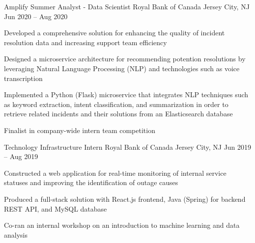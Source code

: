 

\begin{cventries}

  \cventry
	{Amplify Summer Analyst - Data Scientist}
	{Royal Bank of Canada}
	{Jersey City, NJ}
	{Jun 2020 – Aug 2020}
	{
    \begin{cvitems}
		  \item {Developed a comprehensive solution for enhancing the quality of incident resolution data and increasing support team efficiency}
		  \item {Designed a microservice architecture for recommending potention resolutions by leveraging Natural Language Processing (NLP) and technologies such as voice transcription}
		  \item {Implemented a Python (Flask) microservice that integrates NLP techniques such as keyword extraction, intent classification, and summarization in order to retrieve related incidents and their solutions from an Elasticsearch database}
		  \item {Finalist in company-wide intern team competition}
    \end{cvitems}
  }
  
  
  \cventry
  {Technology Infrastructure Intern}
  {Royal Bank of Canada}
  {Jersey City, NJ}
  {Jun 2019 -- Aug 2019}
  {
    \begin{cvitems}
      \item {Constructed a web application for real-time monitoring of internal service statuses and improving the identification of outage causes}
      \item {Produced a full-stack solution with React.js frontend, Java (Spring) for backend REST API, and MySQL database}
      \item {Co-ran an internal workshop on an introduction to machine learning and data analysis}
    \end{cvitems}
  }



\end{cventries}
